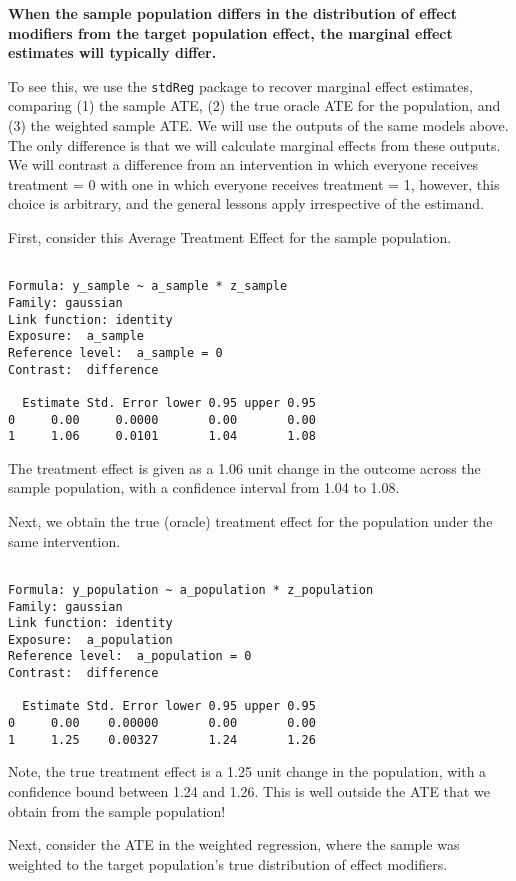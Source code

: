 \documentclass[
  single column]{article}
\begin{document}
\textbf{When the sample population differs in the distribution of effect
modifiers from the target population effect, the marginal effect
estimates will typically differ.}

To see this, we use the \texttt{stdReg} package to recover marginal
effect estimates, comparing (1) the sample ATE, (2) the true oracle ATE
for the population, and (3) the weighted sample ATE. We will use the
outputs of the same models above. The only difference is that we will
calculate marginal effects from these outputs. We will contrast a
difference from an intervention in which everyone receives treatment = 0
with one in which everyone receives treatment = 1, however, this choice
is arbitrary, and the general lessons apply irrespective of the
estimand.

First, consider this Average Treatment Effect for the sample population.

\begin{verbatim}

Formula: y_sample ~ a_sample * z_sample
Family: gaussian 
Link function: identity 
Exposure:  a_sample 
Reference level:  a_sample = 0 
Contrast:  difference 

  Estimate Std. Error lower 0.95 upper 0.95
0     0.00     0.0000       0.00       0.00
1     1.06     0.0101       1.04       1.08
\end{verbatim}

The treatment effect is given as a 1.06 unit change in the outcome
across the sample population, with a confidence interval from 1.04 to
1.08.

Next, we obtain the true (oracle) treatment effect for the population
under the same intervention.

\begin{verbatim}

Formula: y_population ~ a_population * z_population
Family: gaussian 
Link function: identity 
Exposure:  a_population 
Reference level:  a_population = 0 
Contrast:  difference 

  Estimate Std. Error lower 0.95 upper 0.95
0     0.00    0.00000       0.00       0.00
1     1.25    0.00327       1.24       1.26
\end{verbatim}

Note, the true treatment effect is a 1.25 unit change in the population,
with a confidence bound between 1.24 and 1.26. This is well outside the
ATE that we obtain from the sample population!

Next, consider the ATE in the weighted regression, where the sample was
weighted to the target population's true distribution of effect
modifiers.
\end{document}

